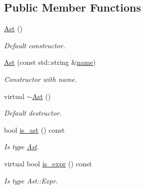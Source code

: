 \subsection*{Public Member Functions}
\begin{DoxyCompactItemize}
\item 
\mbox{\label{classilang_1_1_ast_ac3ce0c23b9fbb09e5acf7548753cb1d1}} 
\mbox{\hyperlink{classilang_1_1_ast_ac3ce0c23b9fbb09e5acf7548753cb1d1}{Ast}} ()
\begin{DoxyCompactList}\small\item\em Default constructor. \end{DoxyCompactList}\item 
\mbox{\label{classilang_1_1_ast_aef23b3e9a35daff1001cdd514378b530}} 
\mbox{\hyperlink{classilang_1_1_ast_aef23b3e9a35daff1001cdd514378b530}{Ast}} (const std\+::string \&\mbox{\hyperlink{classilang_1_1_object_acf20b072e69f572910d7d80c93af0b38}{name}})
\begin{DoxyCompactList}\small\item\em Constructor with name. \end{DoxyCompactList}\item 
\mbox{\label{classilang_1_1_ast_afbbee934f66e030349c990dfa2595d23}} 
virtual \mbox{\hyperlink{classilang_1_1_ast_afbbee934f66e030349c990dfa2595d23}{$\sim$\+Ast}} ()
\begin{DoxyCompactList}\small\item\em Default destructor. \end{DoxyCompactList}\item 
\mbox{\label{classilang_1_1_ast_a071b2d5bf4b3a9ed7ec847e04ab556da}} 
bool \mbox{\hyperlink{classilang_1_1_ast_a071b2d5bf4b3a9ed7ec847e04ab556da}{is\+\_\+ast}} () const
\begin{DoxyCompactList}\small\item\em Is type \mbox{\hyperlink{classilang_1_1_ast}{Ast}}. \end{DoxyCompactList}\item 
\mbox{\label{classilang_1_1_ast_aa9db592b2a805191aa69673ff5d85078}} 
virtual bool \mbox{\hyperlink{classilang_1_1_ast_aa9db592b2a805191aa69673ff5d85078}{is\+\_\+expr}} () const
\begin{DoxyCompactList}\small\item\em Is type Ast\+::\+Expr. \end{DoxyCompactList}\item 

\end{DoxyCompactItemize}
